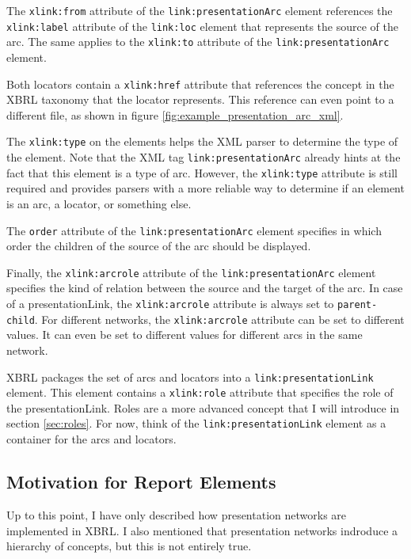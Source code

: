 The \texttt{xlink:from} attribute of the \texttt{link:presentationArc} element references the \texttt{xlink:label} attribute of the \texttt{link:loc} element that represents the source of the arc.
The same applies to the \texttt{xlink:to} attribute of the \texttt{link:presentationArc} element.

Both locators contain a \texttt{xlink:href} attribute that references the concept in the XBRL taxonomy that the locator represents.
This reference can even point to a different file, as shown in figure \ref{fig:example_presentation_arc_xml}.

The \texttt{xlink:type} on the elements helps the XML parser to determine the type of the element.
Note that the XML tag \texttt{link:presentationArc} already hints at the fact that this element is a type of arc.
However, the \texttt{xlink:type} attribute is still required and provides parsers with a more reliable way to determine if an element is an arc, a locator, or something else. 

The \texttt{order} attribute of the \texttt{link:presentationArc} element specifies in which order the children of the source of the arc should be displayed.

\label{sec:arcrole}
Finally, the \texttt{xlink:arcrole} attribute of the \texttt{link:presentationArc} element specifies the kind of relation between the source and the target of the arc.
In case of a presentationLink, the \texttt{xlink:arcrole} attribute is always set to \texttt{parent-child}.
For different networks, the \texttt{xlink:arcrole} attribute can be set to different values.
It can even be set to different values for different arcs in the same network.

XBRL packages the set of arcs and locators into a \texttt{link:presentationLink} element.
This element contains a \texttt{xlink:role} attribute that specifies the role of the presentationLink.
Roles are a more advanced concept that I will introduce in section \ref{sec:roles}.
For now, think of the \texttt{link:presentationLink} element as a container for the arcs and locators.

\subsection{Motivation for Report Elements}
\label{sec:report_elements_motivation}

Up to this point, I have only described how presentation networks are implemented in XBRL.
I also mentioned that presentation networks indroduce a hierarchy of concepts, but this is not entirely true.

